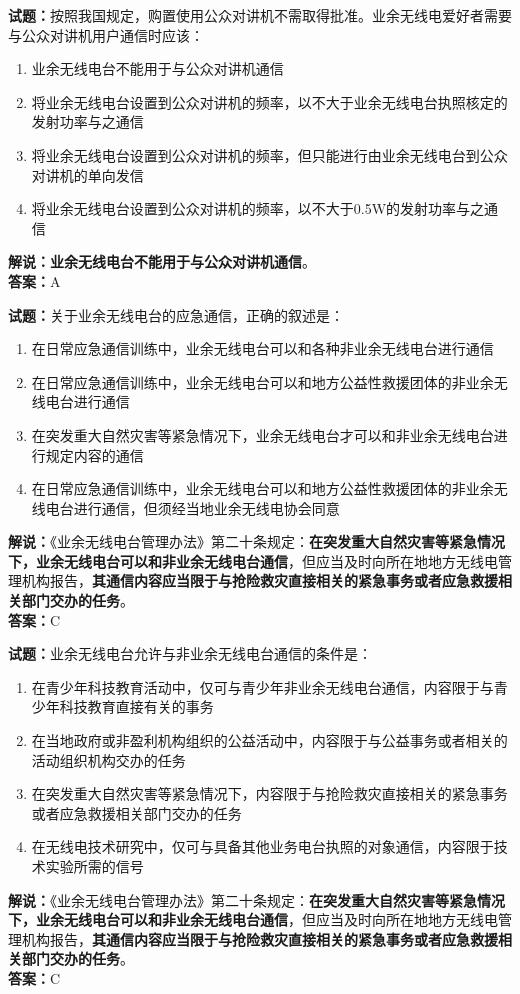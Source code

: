 \documentclass{ctexbook}
\begin{document}
\bigskip


\noindent\textbf{试题：}按照我国规定，购置使用公众对讲机不需取得批准。业余无线电爱好者需要与公众对讲机用户通信时应该：
\begin{enumerate}[leftmargin=3em]
	\item 业余无线电台不能用于与公众对讲机通信
	\item 将业余无线电台设置到公众对讲机的频率，以不大于业余无线电台执照核定的发射功率与之通信
	\item 将业余无线电台设置到公众对讲机的频率，但只能进行由业余无线电台到公众对讲机的单向发信
	\item 将业余无线电台设置到公众对讲机的频率，以不大于0.5W的发射功率与之通信
\end{enumerate}
\noindent\textbf{解说：}\textbf{业余无线电台不能用于与公众对讲机通信}。\\\noindent\textbf{答案：}A


\bigskip


\noindent\textbf{试题：}关于业余无线电台的应急通信，正确的叙述是：
\begin{enumerate}[leftmargin=3em]
	\item 在日常应急通信训练中，业余无线电台可以和各种非业余无线电台进行通信
	\item 在日常应急通信训练中，业余无线电台可以和地方公益性救援团体的非业余无线电台进行通信
	\item 在突发重大自然灾害等紧急情况下，业余无线电台才可以和非业余无线电台进行规定内容的通信
	\item 在日常应急通信训练中，业余无线电台可以和地方公益性救援团体的非业余无线电台进行通信，但须经当地业余无线电协会同意
\end{enumerate}
\noindent\textbf{解说：}《业余无线电台管理办法》第二十条规定：\textbf{在突发重大自然灾害等紧急情况下，业余无线电台可以和非业余无线电台通信}，但应当及时向所在地地方无线电管理机构报告，\textbf{其通信内容应当限于与抢险救灾直接相关的紧急事务或者应急救援相关部门交办的任务}。\\\noindent\textbf{答案：}C



\bigskip


\noindent\textbf{试题：}业余无线电台允许与非业余无线电台通信的条件是：
\begin{enumerate}[leftmargin=3em]
	\item 在青少年科技教育活动中，仅可与青少年非业余无线电台通信，内容限于与青少年科技教育直接有关的事务
	\item 在当地政府或非盈利机构组织的公益活动中，内容限于与公益事务或者相关的活动组织机构交办的任务
	\item 在突发重大自然灾害等紧急情况下，内容限于与抢险救灾直接相关的紧急事务或者应急救援相关部门交办的任务
	\item 在无线电技术研究中，仅可与具备其他业务电台执照的对象通信，内容限于技术实验所需的信号
\end{enumerate}
\noindent\textbf{解说：}《业余无线电台管理办法》第二十条规定：\textbf{在突发重大自然灾害等紧急情况下，业余无线电台可以和非业余无线电台通信}，但应当及时向所在地地方无线电管理机构报告，\textbf{其通信内容应当限于与抢险救灾直接相关的紧急事务或者应急救援相关部门交办的任务}。\\\noindent\textbf{答案：}C
\end{document}
